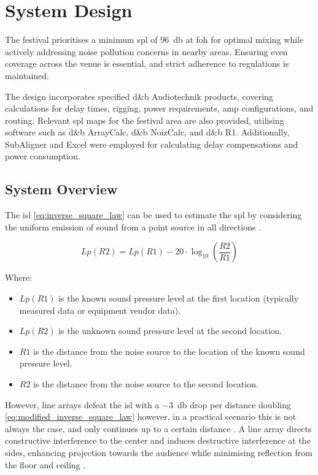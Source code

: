 \section{System Design}   
    The festival prioritises a minimum \gls{spl} of \SI{96}{\decibel} at \gls{foh} for optimal mixing while actively addressing noise pollution concerns in nearby areas. Ensuring even coverage across the venue is essential, and strict adherence to regulations is maintained.

    The design incorporates specified d\&b Audiotechnik products, covering calculations for delay times, rigging, power requirements, amp configurations, and routing. Relevant \gls{spl} maps for the festival area are also provided, utilising software such as d\&b ArrayCalc, d\&b NoizCalc, and d\&b R1. Additionally, SubAligner and Excel were employed for calculating delay compensations and power consumption.
    
    \subsection{System Overview}
    The \gls{isl} \eqref{eq:inverse_square_law} can be used to estimate the \gls{spl} by considering the uniform emission of sound from a point source in all directions \citep{wkc2023}.

    \begin{equation}\label{eq:inverse_square_law}
        Lp(R2) = Lp(R1) - 20 \cdot \log_{10}\left(\frac{R2}{R1}\right)
    \end{equation}
        
    Where:
    \begin{itemize}
        \item $Lp(R1)$ is the known sound pressure level at the first location (typically measured data or equipment vendor data).
        \item $Lp(R2)$ is the unknown sound pressure level at the second location.
        \item $R1$ is the distance from the noise source to the location of the known sound pressure level.
        \item $R2$ is the distance from the noise source to the second location.
    \end{itemize}

    However, line arrays defeat the \gls{isl} with a \SI{-3}{\decibel} drop per distance doubling \citep{brown2010} \eqref{eq:modified_inverse_square_law} however, in a practical scenario this is not always the case, and only continues up to a certain distance \citep{dstewart2016}. A line array directs constructive interference to the center and induces destructive interference at the sides, enhancing projection towards the audience while minimising reflection from the floor and ceiling \citep{dmellor2006}.

